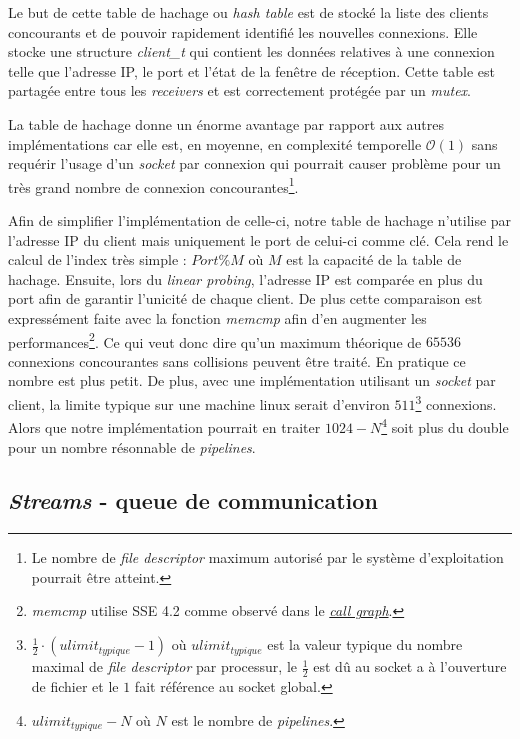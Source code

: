 \documentclass[../main.tex]{subfiles}
\begin{document}
Le but de cette table de hachage ou \textit{hash table} est de stocké la liste des clients concourants et de pouvoir rapidement identifié les nouvelles
connexions. Elle stocke une structure \textit{client\_t} qui contient les données relatives à une connexion telle que l'adresse IP, le port et l'état
de la fenêtre de réception. Cette table est partagée entre tous les \textit{receivers} et est correctement protégée par un \textit{mutex}.

La table de hachage donne un énorme avantage par rapport aux autres implémentations car elle est, en moyenne, en complexité temporelle $\mathcal{O}(1)$\cite{linear_probing}
sans requérir l'usage d'un \textit{socket} par connexion qui pourrait causer problème pour un très grand nombre de connexion concourantes\footnote{
    Le nombre de \textit{file descriptor} maximum autorisé par le système d'exploitation pourrait être atteint.}.

Afin de simplifier l'implémentation de celle-ci, notre table de hachage n'utilise par l'adresse IP du client mais uniquement le port de celui-ci comme
clé. Cela rend le calcul de l'index très simple : $Port \% M$ où $M$ est la capacité de la table de hachage. Ensuite, lors du \textit{linear probing},
l'adresse IP est comparée en plus du port afin de garantir l'unicité de chaque client. De plus cette comparaison est expressément faite avec
la fonction \textit{memcmp} afin d'en augmenter les performances\footnote{ \textit{memcmp} utilise SSE 4.2 comme observé dans le \textit{\hyperref[sec:annexes_call_graph]{call graph}}.}.
Ce qui veut donc dire qu'un maximum théorique de $65536$ connexions concourantes sans collisions peuvent être traité. En pratique ce nombre
est plus petit. De plus, avec une implémentation utilisant un \textit{socket} par client, la limite typique sur une machine linux serait
d'environ $511$\footnote{ $\frac{1}{2} \cdot (ulimit_{typique} - 1)$ où $ulimit_{typique}$ est la valeur typique du nombre maximal de \textit{file descriptor} par processur,
 le $\frac{1}{2}$ est dû au socket a à l'ouverture de fichier et le $1$ fait référence au socket global. } connexions. Alors
que notre implémentation pourrait en traiter $1024 - N$\footnote{ $ulimit_{typique} - N$ où $N$ est le nombre de \textit{pipelines}.} soit plus du double pour
un nombre résonnable de \textit{pipelines}.

\newpage

\subsection{\textit{Streams} - queue de communication}
\label{sec:steams}
\end{document}
